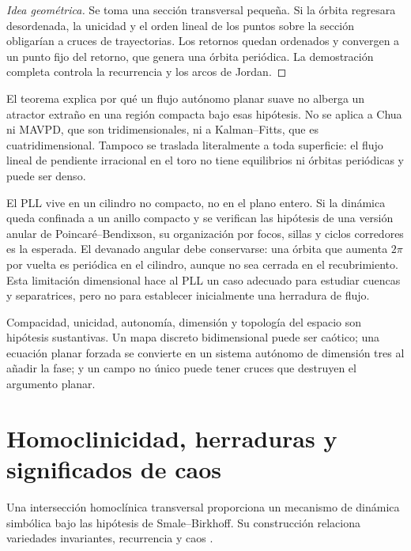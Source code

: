 \begin{proof}[Idea geométrica]
Se toma una sección transversal pequeña. Si la órbita regresara desordenada,
la unicidad y el orden lineal de los puntos sobre la sección obligarían a
cruces de trayectorias. Los retornos quedan ordenados y convergen a un punto
fijo del retorno, que genera una órbita periódica. La demostración completa
controla la recurrencia y los arcos de Jordan.
\end{proof}

El teorema explica por qué un flujo autónomo planar suave no alberga un
atractor extraño en una región compacta bajo esas hipótesis. No se aplica a
Chua ni MAVPD, que son tridimensionales, ni a Kalman--Fitts, que es
cuatridimensional. Tampoco se traslada literalmente a toda superficie: el
flujo lineal de pendiente irracional en el toro no tiene equilibrios ni
órbitas periódicas y puede ser denso.

El PLL vive en un cilindro no compacto, no en el plano entero. Si la dinámica
queda confinada a un anillo compacto y se verifican las hipótesis de una
versión anular de Poincaré--Bendixson, su organización por focos, sillas y
ciclos corredores es la esperada. El devanado angular debe conservarse: una
órbita que aumenta \(2\pi\) por vuelta es periódica en el cilindro, aunque no
sea cerrada en el recubrimiento. Esta limitación dimensional hace al PLL un
caso adecuado para estudiar cuencas y separatrices, pero no para establecer
inicialmente una herradura de flujo.

\begin{remark}
Compacidad, unicidad, autonomía, dimensión y topología del espacio son
hipótesis sustantivas. Un mapa discreto bidimensional puede ser caótico; una
ecuación planar forzada se convierte en un sistema autónomo de dimensión tres
al añadir la fase; y un campo no único puede tener cruces que destruyen el
argumento planar.
\end{remark}

\fi
\HAFOGeoRenderBlocktrue
\ifdefined\HAFOGeoBlockSelect
  \HAFOGeoRenderBlockfalse
  \ifdefined\HAFOGeoBlockChaos\HAFOGeoRenderBlocktrue\fi
\fi
\ifHAFOGeoRenderBlock
\HAFOStudyNeedspace
\section{Homoclinicidad, herraduras y significados de caos}
\label{sec:geo-homoclinic-chaos}

\HAFOCardChaos

Una intersección homoclínica transversal proporciona un mecanismo de dinámica
simbólica bajo las hipótesis de Smale--Birkhoff. Su construcción relaciona
variedades invariantes, recurrencia y caos
\cite{HirschSmaleDevaney2013,DatserisParlitz2022Nonlinear}.

